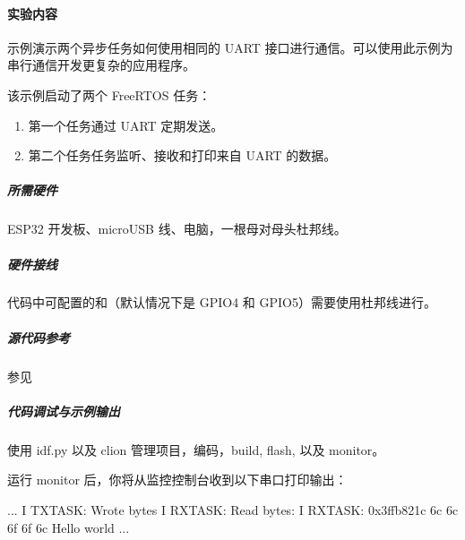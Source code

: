 \documentclass[a4paper,12pt,english]{sphinxmanual}
\begin{document}
{{\paragraph{实验内容}
\label{\detokenize{exp-esp32/peripherals/uart:id13}}
\sphinxAtStartPar
示例演示两个异步任务如何使用相同的 UART 接口进行通信。可以使用此示例为串行通信开发更复杂的应用程序。

\sphinxAtStartPar
该示例启动了两个 FreeRTOS 任务：
\begin{enumerate}
%
\item {} 
\sphinxAtStartPar
第一个任务通过 UART 定期发送。

\item {} 
\sphinxAtStartPar
第二个任务任务监听、接收和打印来自 UART 的数据。

\end{enumerate}


\subparagraph{所需硬件}
\label{\detokenize{exp-esp32/peripherals/uart:id14}}
\sphinxAtStartPar
ESP32 开发板、microUSB 线、电脑，一根母对母头杜邦线。


\subparagraph{硬件接线}
\label{\detokenize{exp-esp32/peripherals/uart:id15}}
\sphinxAtStartPar
代码中可配置的和（默认情况下是 GPIO4 和 GPIO5）需要使用杜邦线进行。


\subparagraph{源代码参考}
\label{\detokenize{exp-esp32/peripherals/uart:id16}}
\sphinxAtStartPar
参见{\hyperref[\detokenize{reference::doc}]{}}


\subparagraph{代码调试与示例输出}
\label{\detokenize{exp-esp32/peripherals/uart:id17}}
\sphinxAtStartPar
使用 idf.py 以及 clion 管理项目，编码，build, flash, 以及 monitor。

\sphinxAtStartPar
运行 monitor 后，你将从监控控制台收到以下串口打印输出：

\begin{sphinxVerbatim}[commandchars=\\\{\}]
...
I  TX\PYGZus{}TASK: Wrote  bytes
I  RX\PYGZus{}TASK: Read  bytes: 
I  RX\PYGZus{}TASK: 0x3ffb821c     6c 6c 6f   6f   6c                  Hello world
...
\end{sphinxVerbatim}


}}
\end{document}
